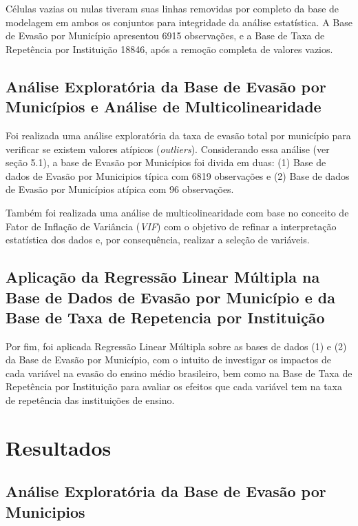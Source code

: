 \documentclass[english, spanish, brazilian]{RBIEarticle} %
\begin{document}
Células vazias ou nulas tiveram suas linhas removidas por completo da base de modelagem em ambos os conjuntos para integridade da análise estatística. A Base de Evasão por Município apresentou 6915 observações, e a Base de Taxa de Repetência por Instituição 18846, após a remoção completa de valores vazios.

\subsection{Análise Exploratória da Base de Evasão por Municípios e Análise de Multicolinearidade}

Foi realizada uma análise exploratória da taxa de evasão total por município para verificar se existem valores atípicos (\textit{outliers}).  Considerando essa análise (ver seção 5.1), a base de Evasão por Municípios foi divida em duas: (1) Base de dados de Evasão por Municipios típica com 6819 observações e (2) Base de dados de Evasão por Municípios atípica com 96 observações. 

Também foi realizada uma análise de multicolinearidade com base no conceito de Fator de Inflação de Variância (\textit{VIF}) com o objetivo de refinar a interpretação estatística dos dados e, por consequência, realizar a seleção de variáveis.

\subsection{Aplicação da Regressão Linear Múltipla na Base de Dados de Evasão por Município e da Base de Taxa de Repetencia por Instituição}

Por fim, foi aplicada Regressão Linear Múltipla sobre as bases de dados (1) e (2) da Base de Evasão por Município, com o intuito de investigar os impactos de cada variável na evasão do ensino médio brasileiro, bem como na Base de Taxa de Repetência por Instituição para avaliar os efeitos que cada variável tem na taxa de repetência das instituições de ensino.



\section{Resultados}

\subsection{Análise Exploratória da Base de Evasão por Municipios}
\end{document}
